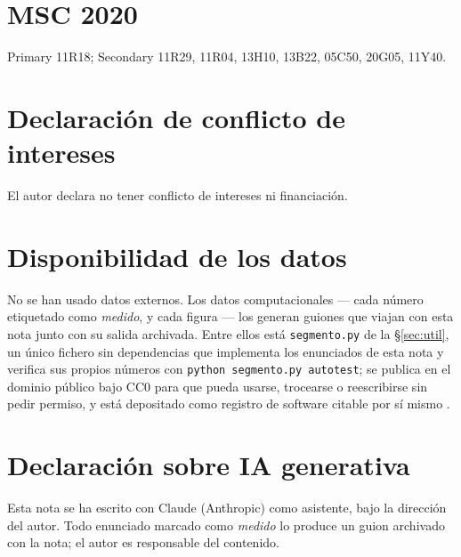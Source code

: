 \documentclass[11pt,a4paper]{article}
\theoremstyle{definition}
\begin{document}
\section*{MSC 2020}
Primary 11R18; Secondary 11R29, 11R04, 13H10, 13B22, 05C50, 20G05, 11Y40.

\section*{Declaraci\'on de conflicto de intereses}
El autor declara no tener conflicto de intereses ni financiaci\'on.

\section*{Disponibilidad de los datos}
No se han usado datos externos. Los datos computacionales --- cada n\'umero etiquetado como
\emph{medido}, y cada figura --- los generan guiones que viajan con esta nota junto con su salida
archivada. Entre ellos est\'a \texttt{segmento.py} de la \S\ref{sec:util}, un \'unico fichero sin
dependencias que implementa los enunciados de esta nota y verifica sus propios n\'umeros con
\texttt{python segmento.py autotest}; se publica en el dominio p\'ublico bajo CC0 para que pueda
usarse, trocearse o reescribirse sin pedir permiso, y est\'a depositado como registro de software
citable por s\'i mismo \cite{Tool}.

\section*{Declaraci\'on sobre IA generativa}
Esta nota se ha escrito con Claude (Anthropic) como asistente, bajo la direcci\'on del autor. Todo
enunciado marcado como \emph{medido} lo produce un guion archivado con la nota; el autor es
responsable del contenido.
\end{document}
